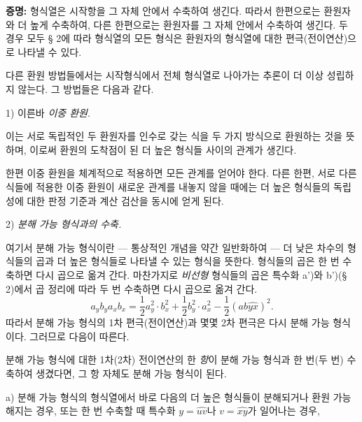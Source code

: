 \textbf{증명:} 형식열은 시작항을 그 자체 안에서 수축하여 생긴다. 따라서 한편으로는 환원자와 더 높게 수축하여, 다른 한편으로는 환원자를 그 자체 안에서 수축하여 생긴다. 두 경우 모두 § 2에 따라 형식열의 모든 형식은 환원자의 형식열에 대한 편극(전이연산)으로 나타낼 수 있다.

다른 환원 방법들에서는 시작형식에서 전체 형식열로 나아가는 추론이 더 이상 성립하지 않는다. 그 방법들은 다음과 같다.

1) 이른바 \emph{\glqq{}이중 환원\grqq{}}.

이는 서로 독립적인 두 환원자를 인수로 갖는 식을 두 가지 방식으로 환원하는 것을 뜻하며, 이로써 환원의 도착점이 된 더 높은 형식들 사이의 관계가 생긴다.

한편 \glqq{}이중 환원\grqq{}을 체계적으로 적용하면 모든 관계를 얻어야 한다. 다른 한편, 서로 다른 식들에 적용한 \glqq{}이중 환원\grqq{}이 새로운 관계를 내놓지 않을 때에는 더 높은 형식들의 독립성에 대한 판정 기준과 계산 검산을 동시에 얻게 된다.

2) \emph{분해 가능 형식과의 수축.}

여기서 \glqq{}분해 가능 형식\grqq{}이란 --- 통상적인 개념을 약간 일반화하여 --- 더 낮은 차수의 형식들의 곱과 \glqq{}더 높은\grqq{} 형식들로 나타낼 수 있는 형식을 뜻한다. 형식들의 곱은 한 번 수축하면 다시 곱으로 옮겨 간다. 마찬가지로 \emph{비선형} 형식들의 곱은 특수화 a')와 b')(§ 2)에서 곱 정리에 따라 두 번 수축하면 다시 곱으로 옮겨 간다.
\[
a_yb_y a_xb_x=\frac12a_y^2\cdot b_x^2+\frac12b_y^2\cdot a_x^2-\frac12(ab\widehat{yx})^2.
\]
따라서 분해 가능 형식의 1차 편극(전이연산)과 몇몇 2차 편극은 다시 분해 가능 형식이다. 그러므로 다음이 따른다.

분해 가능 형식에 대한 1차(2차) 전이연산의 한 \emph{항}이 분해 가능 형식과 한 번(두 번) 수축하여 생겼다면, 그 항 자체도 분해 가능 형식이 된다.

a) 분해 가능 형식의 형식열에서 바로 다음의 더 높은 형식들이 분해되거나 환원 가능해지는 경우, 또는 한 번 수축할 때 특수화 $y=\widehat{uv}$나 $v=\widehat{xy}$가 일어나는 경우,


